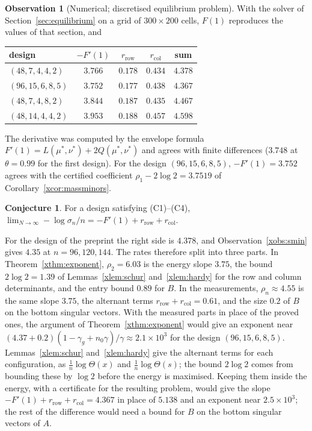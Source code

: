 \documentclass[11pt]{article}
\theoremstyle{definition}
\newtheorem{observation}[theorem]{Observation}
\newtheorem{conjecture}[theorem]{Conjecture}
\begin{document}
\begin{observation}[Numerical; discretised equilibrium problem]\label{xobs:slope}
With the solver of Section~\ref{sec:equilibrium} on a grid of $300\times200$ cells, $F(1)$ reproduces the values of that section, and
\begin{center}
\begin{tabular}{lcccc}
\toprule
design & $-F'(1)$ & $r_{\mathrm{row}}$ & $r_{\mathrm{col}}$ & sum\\
\midrule
$(48,7,4,4,2)$ & $3.766$ & $0.178$ & $0.434$ & $4.378$\\
$(96,15,6,8,5)$ & $3.752$ & $0.177$ & $0.438$ & $4.367$\\
$(48,7,4,8,2)$ & $3.844$ & $0.187$ & $0.435$ & $4.467$\\
$(48,14,4,4,2)$ & $3.953$ & $0.188$ & $0.457$ & $4.598$\\
\bottomrule
\end{tabular}
\end{center}
The derivative was computed by the envelope formula $F'(1)=L(\mu^*,\nu^*)+2Q(\mu^*,\nu^*)$ and agrees with finite differences ($3.748$ at $\theta=0.99$ for the first design). For the design $(96,15,6,8,5)$, $-F'(1)=3.752$ agrees with the certified coefficient $\rho_1-2\log2=3.7519$ of Corollary~\ref{xcor:massminors}.
\end{observation}

\begin{conjecture}\label{xconj:smin}
For a design satisfying (C1)--(C4), $\lim_{N\to\infty}-\log\sigma_n/n=-F'(1)+r_{\mathrm{row}}+r_{\mathrm{col}}$.
\end{conjecture}

For the design of the preprint the right side is $4.378$, and Observation~\ref{xobs:smin} gives $4.35$ at $n=96,120,144$. The rates therefore split into three parts. In Theorem~\ref{xthm:exponent}, $\rho_2=6.03$ is the energy slope $3.75$, the bound $2\log2=1.39$ of Lemmas~\ref{xlem:schur} and~\ref{xlem:hardy} for the row and column determinants, and the entry bound $0.89$ for $B$. In the measurements, $\rho_n\approx4.55$ is the same slope $3.75$, the alternant terms $r_{\mathrm{row}}+r_{\mathrm{col}}=0.61$, and the size $0.2$ of $B$ on the bottom singular vectors. With the measured parts in place of the proved ones, the argument of Theorem~\ref{xthm:exponent} would give an exponent near $(4.37+0.2)(1-\gamma_g+n_0\gamma)/\gamma\approx2.1\times10^3$ for the design $(96,15,6,8,5)$. Lemmas~\ref{xlem:schur} and~\ref{xlem:hardy} give the alternant terms for each configuration, as $\frac1n\log \Theta(x)$ and $\frac1n\log \Theta(s)$; the bound $2\log2$ comes from bounding these by $\log2$ before the energy is maximised. Keeping them inside the energy, with a certificate for the resulting problem, would give the slope $-F'(1)+r_{\mathrm{row}}+r_{\mathrm{col}}=4.367$ in place of $5.138$ and an exponent near $2.5\times10^3$; the rest of the difference would need a bound for $B$ on the bottom singular vectors of $A$.
\end{document}
